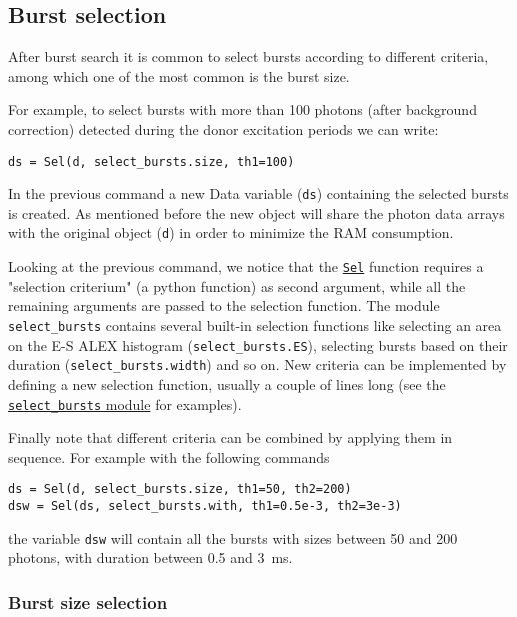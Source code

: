 \subsection{Burst selection}
\label{sec:burstsel}

After burst search it is common to select bursts according to different criteria, among which one of the most common is the burst size.

For example, to select bursts with more than 100 photons (after background correction) detected during the donor excitation periods we can write:

\begin{verbatim}
ds = Sel(d, select_bursts.size, th1=100)
\end{verbatim}

In the previous command a new Data variable (\verb|ds|) containing the selected bursts is created. As mentioned before the new object will share the photon data arrays with the original object (\verb|d|) in order to minimize the RAM consumption.

Looking at the previous command, we notice that the \href{http://fretbursts.readthedocs.org/en/latest/burst_selection.html#fretbursts.burstlib.Sel}{\verb|Sel|} function requires a "selection criterium" (a python function) as second argument, while all the remaining arguments are passed to the selection function. The module \verb|select_bursts| contains several built-in selection functions like
selecting an area on the E-S ALEX histogram (\verb|select_bursts.ES|), 
selecting bursts based on their duration (\verb|select_bursts.width|) and so on. New criteria can be implemented by defining a new selection function, usually a couple of lines long (see the \href{https://github.com/tritemio/FRETBursts/blob/master/fretbursts/select_bursts.py}{\verb|select_bursts| module} for examples).

Finally note that different criteria can be combined by applying them
in sequence. For example with the following commands

\begin{verbatim}
ds = Sel(d, select_bursts.size, th1=50, th2=200)
dsw = Sel(ds, select_bursts.with, th1=0.5e-3, th2=3e-3)
\end{verbatim}

the variable \verb|dsw| will contain all the bursts with sizes between 50 and 200 photons, with duration between 0.5 and 3~ms.

\subsubsection{Burst size selection}

